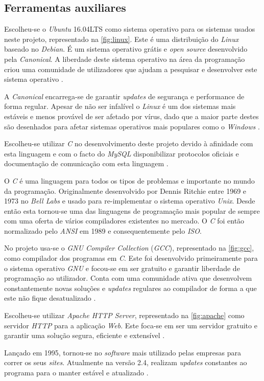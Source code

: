 \documentclass[11pt,twoside,a4paper]{report}
\begin{document}
\subsection{Ferramentas auxiliares}
Escolheu-se o \textit{Ubuntu} 16.04LTS como sistema operativo para os sistemas usados neste projeto, representado na \autoref{fig:linux}. Este é uma distribuição do \textit{Linux} baseado no \textit{Debian}. É um sistema operativo grátis e \textit{open source} desenvolvido pela \textit{Canonical}. A liberdade deste sistema operativo na área da programação criou uma comunidade de utilizadores que ajudam a pesquisar e desenvolver este sistema operativo \cite{ubuntu}.\par 
A \textit{Canonical} encarrega-se de garantir \textit{updates} de segurança e performance de forma regular. Apesar de não ser infalível o \textit{Linux} é um dos sistemas mais estáveis e menos provável de ser afetado por vírus, dado que a maior parte destes são desenhados para afetar sistemas operativos mais populares como o \textit{Windows} \cite{ubuntu}.\par
Escolheu-se utilizar \textit{C} no desenvolvimento deste projeto devido à afinidade com esta linguagem e com o facto do \textit{MySQL} disponibilizar protocolos oficiais e documentação de comunicação com esta linguagem \cite{mysql}.\par
O \textit{C} é uma linguagem para todos os tipos de problemas e importante no mundo da programação. Originalmente desenvolvido por Dennis Ritchie entre 1969 e 1973 no \textit{Bell Labs} e usado para re-implementar o sistema operativo \textit{Unix}. Desde então esta tornou-se uma das linguagens de programação mais popular de sempre com uma oferta de vários compiladores existentes no mercado. O \textit{C} foi então normalizado pelo \textit{ANSI} em 1989 e consequentemente pelo \textit{ISO}.\par 
No projeto usa-se o \textit{GNU Compiler Collection} (\textit{GCC}), representado na \autoref{fig:gcc}, como compilador dos programas em \textit{C}. Este foi desenvolvido primeiramente para o sistema operativo \textit{GNU} e focou-se em ser gratuito e garantir liberdade de programação ao utilizador. Conta com uma comunidade ativa que desenvolvem constantemente novas soluções e \textit{updates} regulares ao compilador de forma a que este não fique desatualizado \cite{gcc}.\par 
Escolheu-se utilizar \textit{Apache HTTP Server}, representado na \autoref{fig:apache} como servidor \textit{HTTP} para a aplicação \textit{Web}. Este foca-se em ser um servidor gratuito e garantir uma solução segura, eficiente e extensível \cite{apache}.\par
Lançado em 1995, tornou-se no \textit{software} mais utilizado pelas empresas para correr os seus \textit{sites}. Atualmente na versão 2.4, realizam \textit{updates} constantes ao programa para o manter estável e atualizado \cite{apache}.
\end{document}
